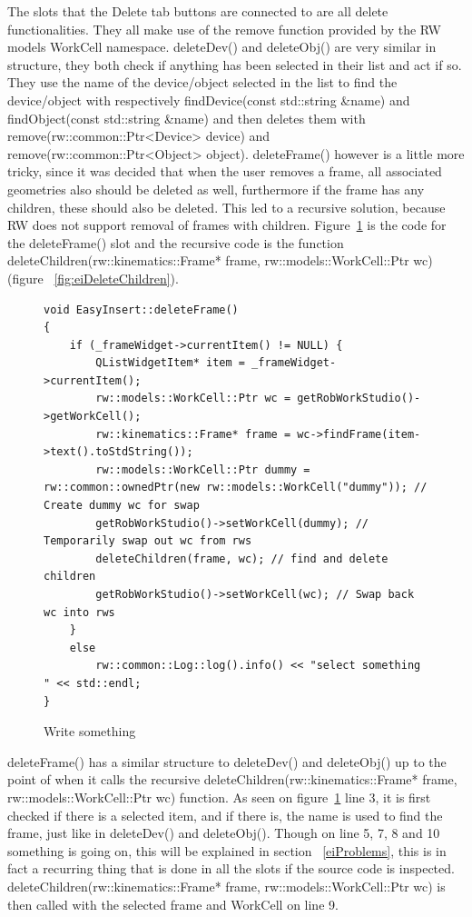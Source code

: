 The slots that the Delete tab buttons are connected to are all delete functionalities. They all make use of the remove function provided by the RW models WorkCell namespace. deleteDev() and deleteObj() are very similar in structure, they both check if anything has been selected in their list and act if so. They use the name of the device/object selected in the list to find the device/object with respectively findDevice(const std::string \&name) and findObject(const std::string \&name) and then deletes them with remove(rw::common::Ptr<Device> device) and remove(rw::common::Ptr<Object> object).
deleteFrame() however is a little more tricky, since it was decided that when the user removes a frame, all associated geometries also should be deleted as well, furthermore if the frame has any children, these should also be deleted. This led to a recursive solution, because RW does not support removal of frames with children. Figure~\ref{fig:eiDeleteFrames} is the code for the deleteFrame() slot and the recursive code is the function deleteChildren(rw::kinematics::Frame* frame, rw::models::WorkCell::Ptr wc) (figure ~\ref{fig:eiDeleteChildren}). 

\begin{figure}[h] %
\centering
\lstset{language=C++} 
\begin{lstlisting}[frame=single]  
void EasyInsert::deleteFrame()
{
    if (_frameWidget->currentItem() != NULL) {
        QListWidgetItem* item = _frameWidget->currentItem();
        rw::models::WorkCell::Ptr wc = getRobWorkStudio()->getWorkCell();
        rw::kinematics::Frame* frame = wc->findFrame(item->text().toStdString());
        rw::models::WorkCell::Ptr dummy = rw::common::ownedPtr(new rw::models::WorkCell("dummy")); // Create dummy wc for swap
        getRobWorkStudio()->setWorkCell(dummy); // Temporarily swap out wc from rws
        deleteChildren(frame, wc); // find and delete children
        getRobWorkStudio()->setWorkCell(wc); // Swap back wc into rws
    }
    else
        rw::common::Log::log().info() << "select something " << std::endl;
}
\end{lstlisting}
\caption{Write something}
\label{fig:eiDeleteFrames} 	
\end{figure}

deleteFrame() has a similar structure to deleteDev() and deleteObj() up to the point of when it calls the recursive deleteChildren(rw::kinematics::Frame* frame, rw::models::WorkCell::Ptr wc) function. As seen on figure~\ref{fig:eiDeleteFrames} line 3, it is first checked if there is a selected item, and if there is, the name is used to find the frame, just like in deleteDev() and deleteObj(). Though on line 5, 7, 8 and 10 something is going on, this will be explained in section ~\ref{eiProblems}, this is in fact a recurring thing that is done in all the slots if the source code is inspected. 
deleteChildren(rw::kinematics::Frame* frame, rw::models::WorkCell::Ptr wc) is then called with the selected frame and WorkCell on line 9.

